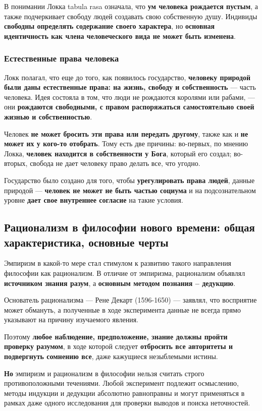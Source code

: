 \documentclass{article}
\begin{document}
\begin{flushleft}
\hfill

В понимании Локка tabula rasa означала, что \textbf{ум человека рождается пустым}, а также подчеркивает свободу людей создавать свою собственную душу. Индивиды \textbf{свободны определять содержание своего характера}, но \textbf{основная идентичность как члена человеческого вида не может быть изменена}.

\subsubsection{Естественные права человека}

Локк полагал, что еще до того, как появилось государство, \textbf{человеку природой были даны естественные права: на жизнь, свободу и собственность} — часть человека. Идея состояла в том, что люди не рождаются королями или рабами, — они \textbf{рождаются свободными, с правом распоряжаться самостоятельно своей жизнью и собственностью}.

\hfill

Человек \textbf{не может бросить эти права или передать другому}, также как и \textbf{не может их у кого-то отобрать}. Тому есть две причины: во-первых, по мнению Локка, \textbf{человек находится в собственности у Бога}, который его создал; во-вторых, свобода не дает человеку право делать все, что угодно.

\hfill

Государство было создано для того, чтобы \textbf{урегулировать права людей}, данные природой — \textbf{человек не может не быть частью социума} и на подсознательном уровне \textbf{дает свое внутреннее согласие} на такие условия.

\subsection{Рационализм в философии нового времени: общая характеристика, основные черты}

Эмпиризм в какой-то мере стал стимулом к развитию такого направления философии как рационализм. В отличие от эмпиризма, рационализм объявлял \textbf{источником знания разум}, а \textbf{основным методом познания – дедукцию}.

Основатель рационализма — Рене Декарт (1596-1650) — заявлял, что восприятие может обмануть, а полученные в ходе эксперимента данные не всегда прямо указывают на причину изучаемого явления.

Поэтому \textbf{любое наблюдение, предположение, знание должны пройти проверку разумом}, в ходе которой следует \textbf{отбросить все авторитеты и подвергнуть сомнению все}, даже кажущиеся незыблемыми истины.

\hfill

\textbf{Но} эмпиризм и рационализм в философии нельзя считать строго противоположными течениями. Любой эксперимент подлежит осмыслению, методы индукции и дедукции абсолютно равноправны и могут применяться в рамках даже одного исследования для проверки выводов и поиска неточностей.

\end{flushleft}
\end{document}
